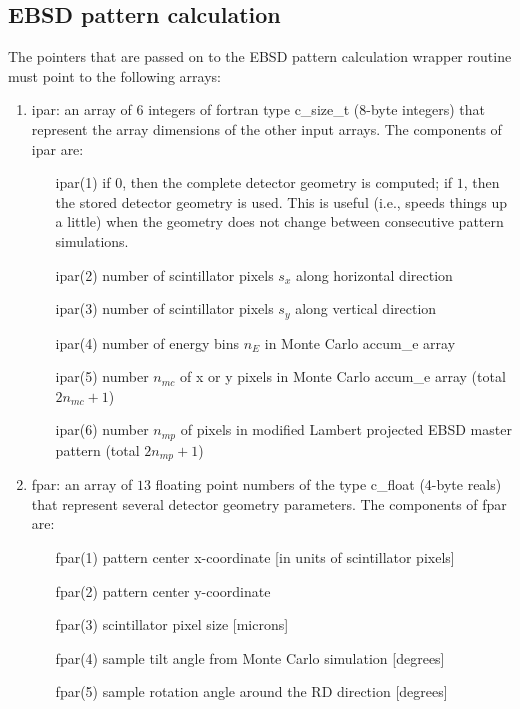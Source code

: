 \documentclass[DIV=calc, paper=letter, fontsize=11pt]{scrartcl}	 %
\begin{document}
\subsection{EBSD pattern calculation}
The pointers that are passed on to the EBSD pattern calculation wrapper routine must point to the following arrays:
\begin{enumerate}
	\item \textsf{ipar}: an array of $6$ integers of fortran type \textsf{c\_size\_t} ($8$-byte integers) that represent the array dimensions
	of the other input arrays.  The components of \textsf{ipar} are:
		\begin{enumerate}
			\item[\textsf{ipar}(1)] if $0$, then the complete detector geometry is computed; if $1$, then the stored detector geometry is used.  This is useful (i.e., speeds things up a little)
			when the geometry does not change between consecutive pattern simulations.
			\item[\textsf{ipar}(2)] number of scintillator pixels $s_x$ along horizontal direction
			\item[\textsf{ipar}(3)] number of scintillator pixels $s_y$ along vertical direction
			\item[\textsf{ipar}(4)] number of energy bins $n_E$ in Monte Carlo \textsf{accum\_e} array
			\item[\textsf{ipar}(5)] number $n_{mc}$ of x or y pixels in Monte Carlo \textsf{accum\_e} array (total $2n_{mc}+1$)
			\item[\textsf{ipar}(6)] number $n_{mp}$ of pixels in modified Lambert projected EBSD master pattern (total $2n_{mp}+1$)
		\end{enumerate}
	\item \textsf{fpar}: an array of $13$ floating point numbers of the type \textsf{c\_float} (4-byte reals) that represent several detector geometry parameters. The 
	components of \textsf{fpar} are:
	\begin{enumerate}
		\item[\textsf{fpar}(1)] pattern center x-coordinate [in units of scintillator pixels]
		\item[\textsf{fpar}(2)] pattern center y-coordinate
		\item[\textsf{fpar}(3)] scintillator pixel size [microns]
		\item[\textsf{fpar}(4)] sample tilt angle from Monte Carlo simulation [degrees]
		\item[\textsf{fpar}(5)] sample rotation angle around the RD direction [degrees]

\end{enumerate}
\end{enumerate}
\end{document}

